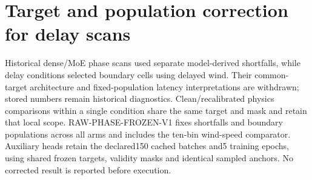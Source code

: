 \documentclass[
  journal]{IEEEtran}
\begin{document}
\section{Target and population correction for delay
scans}\label{target-and-population-correction-for-delay-scans}

Historical dense/MoE phase scans used separate model-derived shortfalls,
while delay conditions selected boundary cells using delayed wind. Their
common-target architecture and fixed-population latency interpretations
are withdrawn; stored numbers remain historical diagnostics.
Clean/recalibrated physics comparisons within a single condition share
the same target and mask and retain that local scope.
RAW-PHASE-FROZEN-V1 fixes shortfalls and boundary populations across all
arms and includes the ten-bin wind-speed comparator. Auxiliary heads
retain the declared150 cached batches and5 training epochs, using shared
frozen targets, validity masks and identical sampled anchors. No
corrected result is reported before execution.
\end{document}
